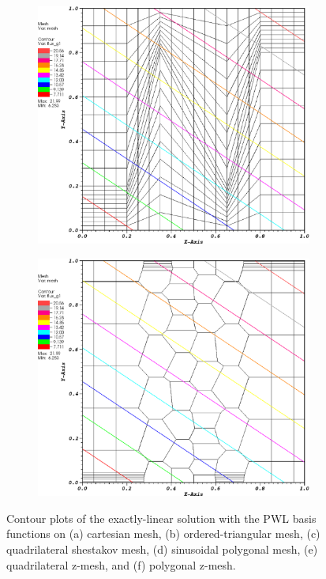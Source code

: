 \begin{figure}
\begin{subfigure}[b]{0.45\textwidth}
		\caption{}
	\end{subfigure}
	\vfill
	\begin{subfigure}[b]{0.45\textwidth}
		\centering
		\label{subfig::z_quad_pwld_lin_sol}
		\includegraphics[width=\textwidth]{figures/sec_BF/z_quad_PWLD_k1.eps}
		\caption{}
	\end{subfigure}
	\hfill
	\begin{subfigure}[b]{0.45\textwidth}
		\centering
		\label{subfig::z_poly_pwld_lin_sol}
		\includegraphics[width=\textwidth]{figures/sec_BF/z_poly_PWLD_k1.eps}
		\caption{}
	\end{subfigure}
\caption{Contour plots of the exactly-linear solution with the PWL basis functions on (a) cartesian mesh, (b) ordered-triangular mesh, (c) quadrilateral shestakov mesh, (d) sinusoidal polygonal mesh, (e) quadrilateral z-mesh, and (f) polygonal z-mesh.}
\label{fig::BF_Results_Linear_pwld_sol}
\end{figure}

